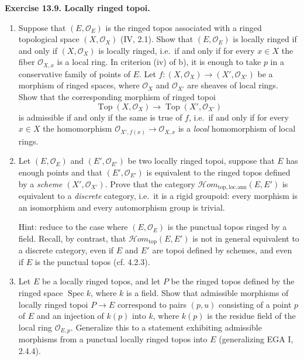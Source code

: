 \documentclass[11pt]{article}
\newcommand{\Oo}{\mathcal{O}}
\newcommand{\Top}{\operatorname{Top}}
\newcommand{\Spec}{\operatorname{Spec}}
\newcommand{\Hhomtop}{\mathcal{H}om_{\mathrm{top}}}
\newcommand{\Hhomtoplocan}{\mathcal{H}om_{\mathrm{top,loc.ann}}}
\newcommand{\ie}{i.e.}
\newenvironment{remarktext}[1]{\par\medskip\noindent\textbf{#1.}\ }{\par\medskip}
\begin{document}
\begin{remarktext}{Exercise 13.9. Locally ringed topoi}
\begin{enumerate}[label=\alph*)]
\item Suppose that $(E,\Oo_E)$ is the ringed topos associated with a ringed topological space $(X,\Oo_X)$ (IV, 2.1). Show that $(E,\Oo_E)$ is locally ringed if and only if $(X,\Oo_X)$ is locally ringed, \ie\ if and only if for every $x\in X$ the fiber $\Oo_{X,x}$ is a local ring. In criterion (iv) of b), it is enough to take $p$ in a conservative family of points of $E$. Let $f:(X,\Oo_X)\to(X',\Oo_{X'})$ be a morphism of ringed spaces, where $\Oo_X$ and $\Oo_{X'}$ are sheaves of local rings. Show that the corresponding morphism of ringed topoi
\[
\Top(X,\Oo_X)\longrightarrow \Top(X',\Oo_{X'})
\]
is admissible if and only if the same is true of $f$, \ie\ if and only if for every $x\in X$ the homomorphism $\Oo_{X',f(x)}\to\Oo_{X,x}$ is a \emph{local} homomorphism of local rings.
\item Let $(E,\Oo_E)$ and $(E',\Oo_{E'})$ be two locally ringed topoi, suppose that $E$ has enough points and that $(E',\Oo_{E'})$ is equivalent to the ringed topos defined by a \emph{scheme} $(X',\Oo_{X'})$. Prove that the category $\Hhomtoplocan(E,E')$ is equivalent to a \emph{discrete} category, \ie\ it is a rigid groupoid: every morphism is an isomorphism and every automorphism group is trivial.

Hint: reduce to the case where $(E,\Oo_E)$ is the punctual topos ringed by a field. Recall, by contrast, that $\Hhomtop(E,E')$ is not in general equivalent to a discrete category, even if $E$ and $E'$ are topoi defined by schemes, and even if $E$ is the punctual topos (cf. 4.2.3).
\item Let $E$ be a locally ringed topos, and let $P$ be the ringed topos defined by the ringed space $\Spec k$, where $k$ is a field. Show that admissible morphisms of locally ringed topoi $P\to E$ correspond to pairs $(p,u)$ consisting of a point $p$ of $E$ and an injection of $k(p)$ into $k$, where $k(p)$ is the residue field of the local ring $\Oo_{E,p}$. Generalize this to a statement exhibiting admissible morphisms from a punctual locally ringed topos into $E$ (generalizing EGA I, 2.4.4).


\end{enumerate}
\end{remarktext}
\end{document}
